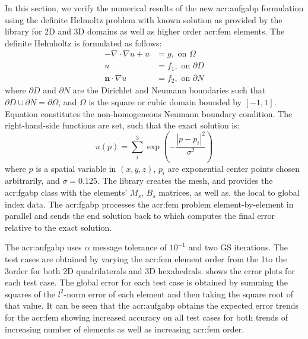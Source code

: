 In this section, we verify the numerical results of the new \gls{acr:aufgabp} formulation using the definite Helmoltz problem with known solution as provided by the \dealName{} library for 2D and 3D domains as well as higher order \gls{acr:fem} elements.
The definite Helmholtz is formulated as follows:
\begin{align}
	-\nabla\cdot\nabla u+ u &= g, \text{ on } \Omega \label{eqn:Helm}\\
	u &= f_1, \text{ on } \partial D \label{eqn:HelmD}\\
	\textbf{n}\cdot \nabla u &= f_2, \text{ on } \partial N \label{eqn:HelmN}
\end{align}
where $\partial D$ and $\partial N$ are the Dirichlet and Neumann boundaries such that $\partial D \cup \partial N = \partial \Omega$, and $\Omega$ is the square or cubic domain bounded by $[-1,1]$.
Equation  constitutes the non-homogeneous Neumann boundary condition.
The right-hand-side functions are set, such that the exact solution is:
\begin{equation}
	u(p) = \sum_i^3 \exp\left( - \frac{| p - p_i |^2}{\sigma^2} \right)
	\label{eqn:exactSol}
\end{equation}
where $p$ is a spatial variable in $(x,y,z)$, $p_i$ are exponential center points chosen arbitrarily, and $\sigma = 0.125$.
The library \dealName{} creates the mesh, and provides the \gls{acr:fgabp} class with the elements' $M_s$, $B_s$ matrices, as well as, the local to global index data.
The \gls{acr:fgabp} processes the \gls{acr:fem} problem element-by-element in parallel and sends the end solution back to \dealName{} which computes the final error relative to the exact solution.



The \gls{acr:aufgabp} uses $\alpha$ message tolerance of $10^{-1}$ and two GS iterations.
The test cases are obtained by varying the \gls{acr:fem} element order from the 1\ssst to the 3\ssrd order for both 2D quadrilaterals and 3D hexahedrals.
 shows the error plots for each test case.
The global error for each test case is obtained by summing the squares of the $l^2$-norm error of each element and then taking the square root of that value.
It can be seen that the \gls{acr:aufgabp} obtains the expected error trends for the \gls{acr:fem} showing increased accuracy on all test cases for both trends of increasing number of elements as well as increasing \gls{acr:fem} order.

